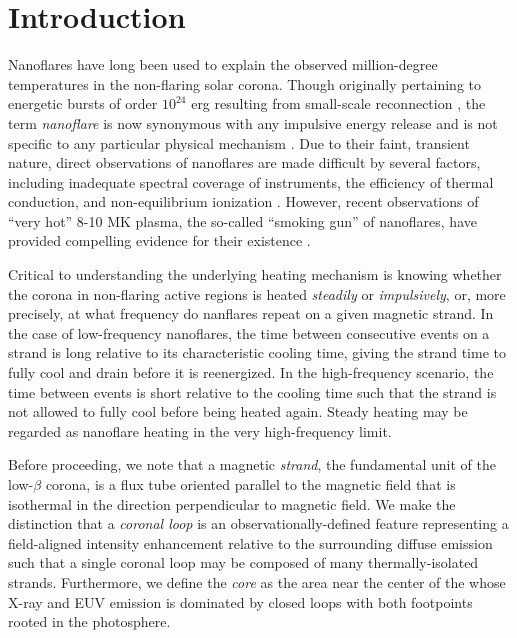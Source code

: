 \section{Introduction}\label{introduction}

Nanoflares have long been used to explain the observed million-degree temperatures in the non-flaring solar corona. Though originally pertaining to energetic bursts of order $10^{24}$ erg resulting from small-scale reconnection \citep{parker_nanoflares_1988}, the term \textit{nanoflare} is now synonymous with any impulsive energy release and is not specific to any particular physical mechanism \citep{klimchuk_key_2015}. Due to their faint, transient nature, direct observations of nanoflares are made difficult by several factors, including inadequate spectral coverage of instruments, the efficiency of thermal conduction, and non-equilibrium ionization \citep{cargill_implications_1994,winebarger_defining_2012,barnes_inference_2016}. However, recent observations of ``very hot'' 8-10 MK plasma, the so-called ``smoking gun'' of nanoflares, have provided compelling evidence for their existence \citep[e.g.][]{brosius_pervasive_2014,caspi_new_2015,parenti_spectroscopy_2017,ishikawa_detection_2017}.

Critical to understanding the underlying heating mechanism is knowing whether the corona in non-flaring active regions is heated \textit{steadily} or \textit{impulsively}, or, more precisely, at what frequency do nanflares repeat on a given magnetic strand. In the case of low-frequency nanoflares, the time between consecutive events on a strand is long relative to its characteristic cooling time, giving the strand time to fully cool and drain before it is reenergized. In the high-frequency scenario, the time between events is short relative to the cooling time such that the strand is not allowed to fully cool before being heated again. Steady heating may be regarded as nanoflare heating in the very high-frequency limit. 

Before proceeding, we note that a magnetic \textit{strand}, the fundamental unit of the low-$\beta$ corona, is a flux tube oriented parallel to the magnetic field that is isothermal in the direction perpendicular to magnetic field. We make the distinction that a \textit{coronal loop} is an observationally-defined feature representing a field-aligned intensity enhancement relative to the surrounding diffuse emission such that a single coronal loop may be composed of many thermally-isolated strands. Furthermore, we define the \AR{} \textit{core} as the area near the center of the \AR{} whose X-ray and EUV emission is dominated by closed loops with both footpoints rooted in the photosphere.

